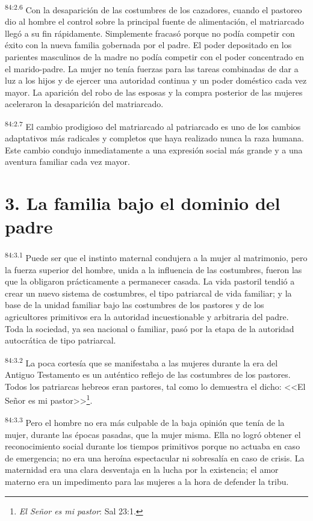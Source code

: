 \par
\textsuperscript{84:2.6} Con la desaparición de las costumbres de los cazadores, cuando el pastoreo dio al hombre el control sobre la principal fuente de alimentación, el matriarcado llegó a su fin rápidamente. Simplemente fracasó porque no podía competir con éxito con la nueva familia gobernada por el padre. El poder depositado en los parientes masculinos de la madre no podía competir con el poder concentrado en el marido-padre. La mujer no tenía fuerzas para las tareas combinadas de dar a luz a los hijos y de ejercer una autoridad continua y un poder doméstico cada vez mayor. La aparición del robo de las esposas y la compra posterior de las mujeres aceleraron la desaparición del matriarcado.

\par
\textsuperscript{84:2.7} El cambio prodigioso del matriarcado al patriarcado es uno de los cambios adaptativos más radicales y completos que haya realizado nunca la raza humana. Este cambio condujo inmediatamente a una expresión social más grande y a una aventura familiar cada vez mayor.

\section*{3. La familia bajo el dominio del padre}
\par
\textsuperscript{84:3.1} Puede ser que el instinto maternal condujera a la mujer al matrimonio, pero la fuerza superior del hombre, unida a la influencia de las costumbres, fueron las que la obligaron prácticamente a permanecer casada. La vida pastoril tendió a crear un nuevo sistema de costumbres, el tipo patriarcal de vida familiar; y la base de la unidad familiar bajo las costumbres de los pastores y de los agricultores primitivos era la autoridad incuestionable y arbitraria del padre. Toda la sociedad, ya sea nacional o familiar, pasó por la etapa de la autoridad autocrática de tipo patriarcal.

\par
\textsuperscript{84:3.2} La poca cortesía que se manifestaba a las mujeres durante la era del Antiguo Testamento es un auténtico reflejo de las costumbres de los pastores. Todos los patriarcas hebreos eran pastores, tal como lo demuestra el dicho: <<El Señor es mi pastor>>\footnote{\textit{El Señor es mi pastor}: Sal 23:1.}.

\par
\textsuperscript{84:3.3} Pero el hombre no era más culpable de la baja opinión que tenía de la mujer, durante las épocas pasadas, que la mujer misma. Ella no logró obtener el reconocimiento social durante los tiempos primitivos porque no actuaba en caso de emergencia; no era una heroína espectacular ni sobresalía en caso de crisis. La maternidad era una clara desventaja en la lucha por la existencia; el amor materno era un impedimento para las mujeres a la hora de defender la tribu.

